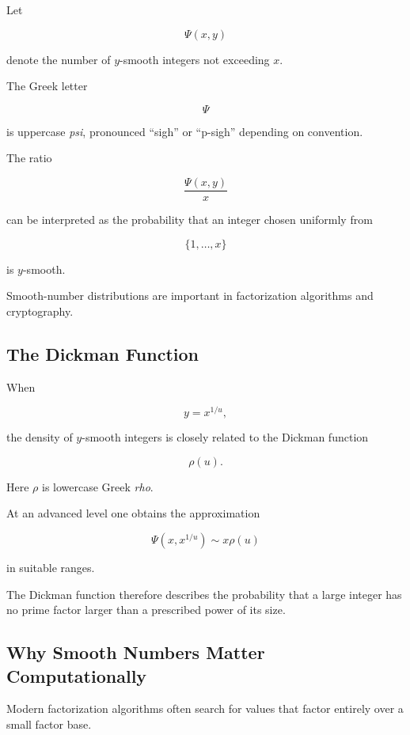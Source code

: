 Let

\[ \Psi(x,y) \]

denote the number of \(y\)-smooth integers not exceeding \(x\).

The Greek letter

\[ \Psi \]

is uppercase \emph{psi}, pronounced ``sigh'' or ``p-sigh'' depending on
convention.

The ratio

\[ \frac{\Psi(x,y)}x \]

can be interpreted as the probability that an integer chosen uniformly from

\[ \{1,\ldots,x\} \]

is \(y\)-smooth.

Smooth-number distributions are important in factorization algorithms and
cryptography.

\subsection{The Dickman Function}
\label{subsec:dickman-function}

When

\[ y=x^{1/u}, \]

the density of \(y\)-smooth integers is closely related to the Dickman
function

\[ \rho(u). \]

Here \(\rho\) is lowercase Greek \emph{rho}.

At an advanced level one obtains the approximation

\[ \Psi(x,x^{1/u})\sim x\rho(u) \]

in suitable ranges.

The Dickman function therefore describes the probability that a large integer
has no prime factor larger than a prescribed power of its size.

\subsection{Why Smooth Numbers Matter Computationally}
\label{subsec:smooth-numbers-probability-computation}

Modern factorization algorithms often search for values that factor entirely
over a small factor base.

